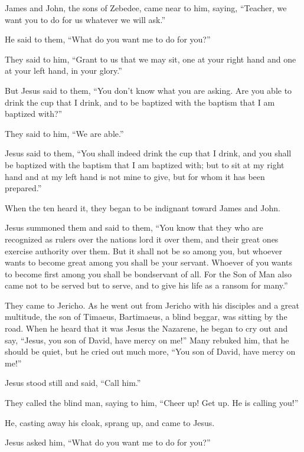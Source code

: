  James and John, the sons of Zebedee, came near to him,
saying, ``Teacher, we want you to do for us whatever we will ask.''

 He said to them, ``What do you want me to do for you?''

 They said to him, ``Grant to us that we may sit, one at
your right hand and one at your left hand, in your glory.''

 But Jesus said to them, ``You don't know what you are
asking. Are you able to drink the cup that I drink, and to be baptized
with the baptism that I am baptized with?''

 They said to him, ``We are able.''

Jesus said to them, ``You shall indeed drink the cup that I drink, and
you shall be baptized with the baptism that I am baptized with;
 but to sit at my right hand and at my left hand is not
mine to give, but for whom it has been prepared.''

 When the ten heard it, they began to be indignant toward
James and John.

 Jesus summoned them and said to them, ``You know that
they who are recognized as rulers over the nations lord it over them,
and their great ones exercise authority over them.  But
it shall not be so among you, but whoever wants to become great among
you shall be your servant.  Whoever of you wants to
become first among you shall be bondservant of all.  For
the Son of Man also came not to be served but to serve, and to give his
life as a ransom for many.''

 They came to Jericho. As he went out from Jericho with
his disciples and a great multitude, the son of Timaeus, Bartimaeus, a
blind beggar, was sitting by the road.  When he heard
that it was Jesus the Nazarene, he began to cry out and say, ``Jesus,
you son of David, have mercy on me!''  Many rebuked him,
that he should be quiet, but he cried out much more, ``You son of David,
have mercy on me!''

 Jesus stood still and said, ``Call him.''

They called the blind man, saying to him, ``Cheer up! Get up. He is
calling you!''

 He, casting away his cloak, sprang up, and came to
Jesus.

 Jesus asked him, ``What do you want me to do for you?''

